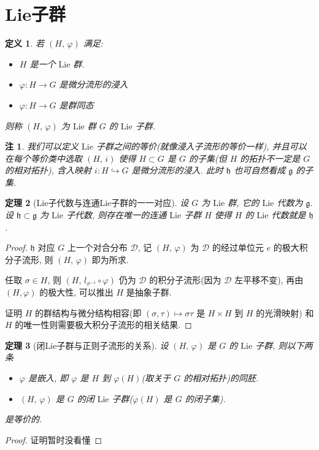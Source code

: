 \documentclass{book}
\newtheorem{theorem}{\indent 定理}[section]
\newtheorem{definition}[theorem]{\indent 定义}
\newtheorem*{remark}{\indent 注}
\begin{document}
    \section{Lie子群}
        \begin{definition}
            若 $(H,\,\varphi)$ 满足:
            \begin{itemize}
                \item $H$ 是一个 $\mathrm{Lie}$ 群.
                \item $\varphi:H\rightarrow G$ 是微分流形的浸入
                \item $\varphi:H\rightarrow G$ 是群同态
            \end{itemize}
            则称 $(H,\,\varphi)$ 为 $\mathrm{Lie}$ 群 $G$ 的 $\mathrm{Lie}$ 子群.
        \end{definition}
        \begin{remark}
            我们可以定义 $\mathrm{Lie}$ 子群之间的等价(就像浸入子流形的等价一样),
            并且可以在每个等价类中选取 $(H,\,i)$ 使得 $H\subset G$ 是 $G$ 的子集(但 $H$ 的拓扑不一定是 $G$ 的相对拓扑), 含入映射 $i:H\hookrightarrow G$ 是微分流形的浸入.
            此时 $\mathfrak{h}$ 也可自然看成 $\mathfrak{g}$ 的子集.
        \end{remark}
        \begin{theorem}[Lie子代数与连通Lie子群的一一对应]
            设 $G$ 为 $\mathrm{Lie}$ 群, 它的 $\mathrm{Lie}$ 代数为 $\mathfrak{g}$. 设 $\mathfrak{h}\subset\mathfrak{g}$ 为 $\mathrm{Lie}$ 子代数,
            则存在唯一的连通 $\mathrm{Lie}$ 子群 $H$ 使得 $H$ 的 $\mathrm{Lie}$ 代数就是 $\mathfrak{h}$.
        \end{theorem}
        \begin{proof}
            $\mathfrak{h}$ 对应 $G$ 上一个对合分布 $\mathcal{D}$, 记 $(H,\,\varphi)$ 为 $\mathcal{D}$ 的经过单位元 $e$ 的极大积分子流形, 则 $(H,\,\varphi)$ 即为所求.
            
            任取 $\sigma\in H$, 则 $(H,\,l_{\sigma^{-1}}\circ\varphi)$ 仍为 $\mathcal{D}$ 的积分子流形(因为 $\mathcal{D}$ 左平移不变), 再由 $(H,\varphi)$ 的极大性, 可以推出 $H$ 是抽象子群.
            
            证明 $H$ 的群结构与微分结构相容(即 $(\sigma,\tau)\mapsto\sigma\tau$ 是 $H\times H$ 到 $H$ 的光滑映射) 和 $H$ 的唯一性则需要极大积分子流形的相关结果.
        \end{proof}
        \begin{theorem}[闭Lie子群与正则子流形的关系]
            设 $(H,\,\varphi)$ 是 $G$ 的 $\mathrm{Lie}$ 子群, 则以下两条
            \begin{itemize}
                \item $\varphi$ 是嵌入, 即 $\varphi$ 是 $H$ 到 $\varphi(H)$(取关于 $G$ 的相对拓扑)的同胚.
                \item $(H,\,\varphi)$ 是 $G$ 的闭 $\mathrm{Lie}$ 子群($\varphi(H)$ 是 $G$ 的闭子集).
            \end{itemize}
            是等价的.
        \end{theorem}
        \begin{proof}
            证明暂时没看懂
        \end{proof}
\end{document}
